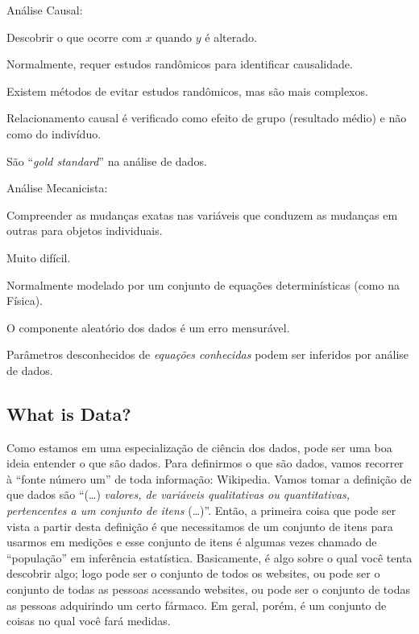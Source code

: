 \begin{multicols}{2}
\begin{nitemize}
\item Análise Causal:
  \begin{nitemize}
  \item Descobrir o que ocorre com $x$ quando $y$ é alterado.
  \item Normalmente, requer estudos randômicos para identificar causalidade.
  \item Existem métodos de evitar estudos randômicos, mas são mais complexos.
  \item Relacionamento causal é verificado como efeito de grupo (resultado médio) e não como do indivíduo.
  \item São ``\textit{gold standard}'' na análise de dados.
  \end{nitemize}
  
\item Análise Mecanicista:
  \begin{nitemize}
  \item Compreender as mudanças exatas nas variáveis que conduzem as mudanças em outras para objetos individuais.
  \item Muito difícil.
  \item Normalmente modelado por um conjunto de equações determinísticas (como na Física).
  \item O componente aleatório dos dados é um erro mensurável.
  \item Parâmetros desconhecidos de \emph{equações conhecidas} podem ser inferidos por análise de dados.
  \end{nitemize}
\end{nitemize}
\end{multicols}


\subsection{What is Data?}

Como estamos em uma especialização de ciência dos dados, pode ser uma boa ideia entender o que são dados. Para definirmos o que são dados, vamos recorrer à ``fonte número um'' de toda informação: Wikipedia. Vamos tomar a definição de que dados são ``(\ldots) \emph{valores, de variáveis qualitativas ou quantitativas, pertencentes a um conjunto de itens} (\ldots)''. Então, a primeira coisa que pode ser vista a partir desta definição é que necessitamos de um conjunto de itens para usarmos em medições e esse conjunto de itens é algumas vezes chamado de ``população'' em inferência estatística. Basicamente, é algo sobre o qual você tenta descobrir algo; logo pode ser o conjunto de todos os websites, ou pode ser o conjunto de todas as pessoas acessando websites, ou pode ser o conjunto de todas as pessoas adquirindo um certo fármaco. Em geral, porém, é um conjunto de coisas no qual você fará medidas.

